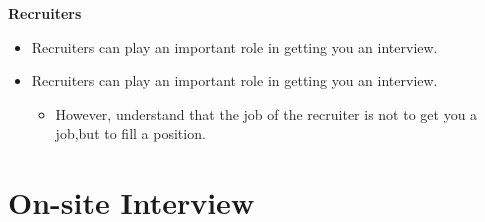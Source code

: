 \documentclass{beamer}
\begin{document}
\begin{frame}
	\center
	\textbf{Recruiters}\\
	\pause
	\begin{itemize}
		\item  Recruiters can play an important role in getting you an interview.
		\item Recruiters can play an important role in getting you an interview.
		\begin{itemize}
			\item However, understand that the job of the recruiter is not to get
			you a job,\pause \alert {but to fill a position.}
		\end{itemize}
	\end{itemize}
\end{frame}
\section{On-site Interview}
\end{document}
